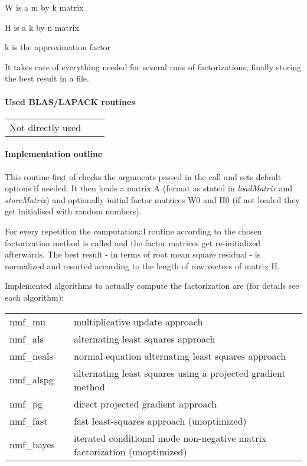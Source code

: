 \documentclass[a4paper,10pt]{scrartcl}
\begin{document}
					W is a m by k matrix

 					H is a k by n matrix

 					k is the approximation factor\newline


					It takes care of everything needed for several runs of
					factorizations, finally storing the best result in a file.\newline
 		
			\paragraph{Used BLAS/LAPACK routines}

					\begin{tabular}{lcl}
						Not directly used && \\
					\end{tabular}

			\paragraph{Implementation outline}
			

					This routine first of checks the arguments passed in the call and sets
					default options if needed.
					It then loads a matrix A (format as stated in \emph{loadMatrix} and
					 \emph{storeMatrix}) and optionally initial factor matrices W0 and H0 (if 
					not loaded they get initialised with random numbers).
					\newline



					For every repetition the computational routine according to the chosen
					factorization method is called and the factor matrices get re-initialized
					afterwards. The best result - in terms of root mean
					square residual - is normalized and resorted according to the length of
					row vectors of matrix H.
					\newline


					Implemented algorithms to actually compute the factorization are (for 
					details see each algorithm):
 					\newline


					\begin{tabular}{lcl}
 					nmf\_mu	&& multiplicative update approach\\
 					nmf\_als && alternating least squares approach\\
 					nmf\_neals && normal equation alternating least squares approach\\
 					nmf\_alspg && alternating least squares using a projected 
							gradient method\\
					nmf\_pg && direct projected gradient approach\\
					nmf\_fast && fast least-squares approach (unoptimized)\\
					nmf\_bayes && iterated conditional mode non-negative matrix factorization (unoptimized)\\
					\end{tabular}
\end{document}
